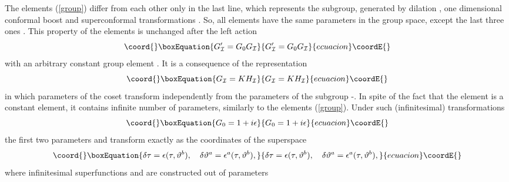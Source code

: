 \documentclass[a4paper,twocolumn,showpacs,preprintnumbers,amsmath,amssymb]{revtex4}
\begin{document}
The elements \coordHE{} (\ref{group}) differ
from each other only in the last line, which represents
the subgroup, generated by dilation \coordHE{},
one dimensional conformal
boost \coordHE{} and \coordHE{} superconformal
transformations \coordHE{}.
So, all \coordHE{} elements have the same parameters in the group space,
except the last three
ones \coordHE{}.
This property of the elements is unchanged after the left action
\begin{equation}\coord{}\boxEquation{\label{left}
G'_{\cal I}=G_0 G_{\cal I}
}{G'_{\cal I}=G_0 G_{\cal I}
}{ecuacion}\coordE{}\end{equation}
 with  an arbitrary constant group element \coordHE{}. It is a consequence of the
 representation
 \begin{equation}\coord{}\boxEquation{\label{kh}
G_{\cal I}=K H_{\cal I}
}{G_{\cal I}=K H_{\cal I}
}{ecuacion}\coordE{}\end{equation}
in which parameters of the coset \coordHE{} transform independently from the
parameters of the subgroup \coordHE{}\cite{CWZ}-\cite{PK}.
In spite of the fact that the element \coordHE{} is a constant element, it contains
infinite number of parameters, similarly to the elements (\ref{group}).
Under such (infinitesimal) transformations
\begin{equation}\coord{}\boxEquation{\label{inf}
G_0=1+i\epsilon
}{G_0=1+i\epsilon
}{ecuacion}\coordE{}\end{equation}
the first
two parameters \myHighlight{$\tau$}\coordHE{} and
\coordHE{} transform exactly
as the coordinates \coordHE{} of the \coordHE{}  su\-per\-space\cite{P_0}
\begin{equation}\coord{}\boxEquation{\label{trans}
\delta \tau = \epsilon(\tau,\vartheta^b),\quad
\delta \vartheta^a = \epsilon^a(\tau,\vartheta^b),
}{\delta \tau = \epsilon(\tau,\vartheta^b),\quad
\delta \vartheta^a = \epsilon^a(\tau,\vartheta^b),
}{ecuacion}\coordE{}\end{equation}
where infinitesimal superfunctions \coordHE{} and
\coordHE{} are constructed out of parameters
\end{document}
